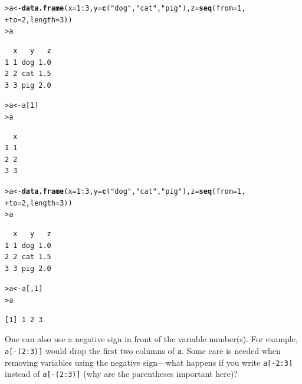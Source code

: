 \documentclass[12pt,oneside]{book}\usepackage[]{graphicx}\usepackage[]{color}
\makeatletter
\newcommand{\hlnum}[1]{\textcolor[rgb]{0.686,0.059,0.569}{#1}}%
\newcommand{\hlstr}[1]{\textcolor[rgb]{0.192,0.494,0.8}{#1}}%
\newcommand{\hlopt}[1]{\textcolor[rgb]{0,0,0}{#1}}%
\newcommand{\hlstd}[1]{\textcolor[rgb]{0.345,0.345,0.345}{#1}}%
\newcommand{\hlkwb}[1]{\textcolor[rgb]{0.69,0.353,0.396}{#1}}%
\newcommand{\hlkwc}[1]{\textcolor[rgb]{0.333,0.667,0.333}{#1}}%
\newcommand{\hlkwd}[1]{\textcolor[rgb]{0.737,0.353,0.396}{\textbf{#1}}}%
\newenvironment{kframe}{%
 \def\at@end@of@kframe{}%
 \ifinner\ifhmode%
  \def\at@end@of@kframe{\end{minipage}}%
  \begin{minipage}{\columnwidth}%
 \fi\fi%
 \def\FrameCommand##1{\hskip\@totalleftmargin \hskip-\fboxsep
 \colorbox{shadecolor}{##1}\hskip-\fboxsep
     \hskip-\linewidth \hskip-\@totalleftmargin \hskip\columnwidth}%
 \MakeFramed {\advance\hsize-\width
   \@totalleftmargin\z@ \linewidth\hsize
   \@setminipage}}%
 {\par\unskip\endMakeFramed%
 \at@end@of@kframe}
\newenvironment{knitrout}{}{} %
\makeatother
\begin{document}
\begin{knitrout}
\color{fgcolor}\begin{kframe}
\begin{alltt}
\hlstd{> }\hlstd{a} \hlkwb{<-} \hlkwd{data.frame}\hlstd{(}\hlkwc{x} \hlstd{=} \hlnum{1}\hlopt{:}\hlnum{3}\hlstd{,} \hlkwc{y} \hlstd{=} \hlkwd{c}\hlstd{(}\hlstr{"dog"}\hlstd{,} \hlstr{"cat"}\hlstd{,} \hlstr{"pig"}\hlstd{),} \hlkwc{z} \hlstd{=} \hlkwd{seq}\hlstd{(}\hlkwc{from} \hlstd{=} \hlnum{1}\hlstd{,}
\hlstd{+ }    \hlkwc{to} \hlstd{=} \hlnum{2}\hlstd{,} \hlkwc{length} \hlstd{=} \hlnum{3}\hlstd{))}
\hlstd{> }\hlstd{a}
\end{alltt}
\begin{verbatim}
  x   y   z
1 1 dog 1.0
2 2 cat 1.5
3 3 pig 2.0
\end{verbatim}
\begin{alltt}
\hlstd{> }\hlstd{a} \hlkwb{<-} \hlstd{a[}\hlnum{1}\hlstd{]}
\hlstd{> }\hlstd{a}
\end{alltt}
\begin{verbatim}
  x
1 1
2 2
3 3
\end{verbatim}
\begin{alltt}
\hlstd{> }\hlstd{a} \hlkwb{<-} \hlkwd{data.frame}\hlstd{(}\hlkwc{x} \hlstd{=} \hlnum{1}\hlopt{:}\hlnum{3}\hlstd{,} \hlkwc{y} \hlstd{=} \hlkwd{c}\hlstd{(}\hlstr{"dog"}\hlstd{,} \hlstr{"cat"}\hlstd{,} \hlstr{"pig"}\hlstd{),} \hlkwc{z} \hlstd{=} \hlkwd{seq}\hlstd{(}\hlkwc{from} \hlstd{=} \hlnum{1}\hlstd{,}
\hlstd{+ }    \hlkwc{to} \hlstd{=} \hlnum{2}\hlstd{,} \hlkwc{length} \hlstd{=} \hlnum{3}\hlstd{))}
\hlstd{> }\hlstd{a}
\end{alltt}
\begin{verbatim}
  x   y   z
1 1 dog 1.0
2 2 cat 1.5
3 3 pig 2.0
\end{verbatim}
\begin{alltt}
\hlstd{> }\hlstd{a} \hlkwb{<-} \hlstd{a[,} \hlnum{1}\hlstd{]}
\hlstd{> }\hlstd{a}
\end{alltt}
\begin{verbatim}
[1] 1 2 3
\end{verbatim}
\end{kframe}
\end{knitrout}

One can also use a negative sign in front of the variable number(s). For example, \verb+a[-(2:3)]+ would drop the first two columns of \verb+a+. Some care is needed when removing variables using the negative sign---what happens if you write \verb+a[-2:3]+ instead of \verb+a[-(2:3)]+ (why are the parentheses important here)?
\end{document}
